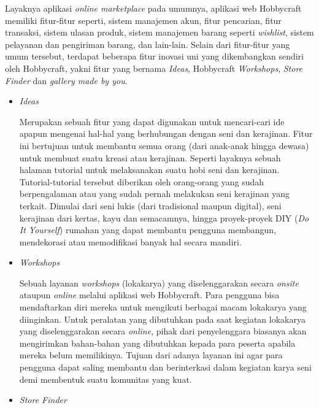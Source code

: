 \documentclass[a4paper]{article}
\begin{document}
\begin{itemize}
\begin{enumerate}
        Layaknya aplikasi \textit{online marketplace} pada umumnya, aplikasi web Hobbycraft memiliki fitur-fitur seperti, sistem manajemen akun, fitur pencarian, fitur transaksi, sistem ulasan produk, sistem manajemen barang seperti \textit{wishlist}, sistem pelayanan dan pengiriman barang, dan lain-lain. Selain dari fitur-fitur yang umum tersebut, terdapat beberapa fitur inovasi uni yang dikembangkan sendiri oleh Hobbycraft, yakni fitur yang bernama \textit{Ideas}, Hobbycraft \textit{Workshops}, \textit{Store Finder} dan \textit{gallery made by you}\autocite{hobbycraft-web}.

        \begin{itemize}
            \item \textit{Ideas}
            
            Merupakan sebuah fitur yang dapat digunakan untuk mencari-cari ide apapun mengenai hal-hal yang berhubungan dengan seni dan kerajinan. Fitur ini bertujuan untuk membantu semua orang (dari anak-anak hingga dewasa) untuk membuat suatu kreasi atau kerajinan. Seperti layaknya sebuah halaman tutorial untuk melaksanakan suatu hobi seni dan kerajinan. Tutorial-tutorial tersebut diberikan oleh orang-orang yang sudah berpengalaman atau yang sudah pernah melakukan seni kerajinan yang terkait. Dimulai dari seni lukis (dari tradisional maupun digital), seni kerajinan dari kertas, kayu dan semacamnya, hingga proyek-proyek DIY (\textit{Do It Yourself}) rumahan yang dapat membantu pengguna membangun, mendekorasi atau memodifikasi banyak hal secara mandiri\autocite{hobbycraft-ideas}.

            \item \textit{Workshops}
            
            Sebuah layanan \textit{workshops} (lokakarya) yang diselenggarakan secara \textit{onsite} ataupun \textit{online} melalui aplikasi web Hobbycraft. Para pengguna bisa mendaftarkan diri mereka untuk mengikuti berbagai macam lokakarya yang diinginkan. Untuk peralatan yang dibutuhkan pada saat kegiatan lokakarya yang diselenggarakan secara \textit{online}, pihak dari penyelenggara biasanya akan mengirimkan bahan-bahan yang dibutuhkan kepada para peserta apabila mereka belum memilikinya. Tujuan dari adanya layanan ini agar para pengguna dapat saling membantu dan berinterkasi dalam kegiatan karya seni demi membentuk suatu komunitas yang kuat\autocite{hobbycraft-workshops}.

            \item \textit{Store Finder}
            

\end{itemize}
\end{enumerate}
\end{itemize}
\end{document}
